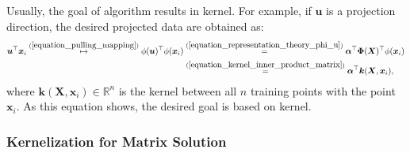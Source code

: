 \documentclass[lang=cn,10pt]{gorgeousnbook}
\numberwithin{equation}{section}%
\numberwithin{figure}{section}%
\begin{document}
Usually, the goal of algorithm results in kernel. For example, if $\boldsymbol{u}$ is a projection direction, the desired projected data are obtained as:
\begin{align}
\boldsymbol{u}^\top \boldsymbol{x}_i \overset{(\ref{equation_pulling_mapping})}{\mapsto} \phi(\boldsymbol{u})^\top \phi(\boldsymbol{x}_i) &\overset{(\ref{equation_representation_theory_phi_u})}{=} \boldsymbol{\alpha}^\top \boldsymbol{\Phi}(\boldsymbol{X})^\top \phi(\boldsymbol{x}_i) \nonumber \\
&\overset{(\ref{equation_kernel_inner_product_matrix})}{=} \boldsymbol{\alpha}^\top \boldsymbol{k}(\boldsymbol{X}, \boldsymbol{x}_i),
\end{align}
where $\boldsymbol{k}(\boldsymbol{X}, \boldsymbol{x}_i) \in \mathbb{R}^n$ is the kernel between all $n$ training points with the point $\boldsymbol{x}_i$.
As this equation shows, the desired goal is based on kernel. 

\subsubsection{Kernelization for Matrix Solution}
\end{document}

